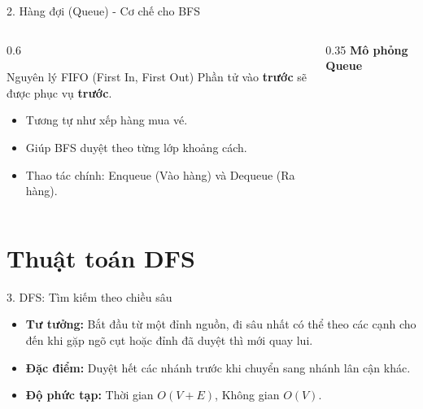 \begin{frame}{2. Hàng đợi (Queue) - Cơ chế cho BFS}
    \begin{columns}
        \begin{column}{0.6\textwidth}
            \begin{block}{Nguyên lý FIFO (First In, First Out)}
                Phần tử vào \textbf{trước} sẽ được phục vụ \textbf{trước}.
            \end{block}
            \begin{itemize}
                \item Tương tự như xếp hàng mua vé.
                \item Giúp BFS duyệt theo từng lớp khoảng cách.
                \item Thao tác chính: Enqueue (Vào hàng) và Dequeue (Ra hàng).
            \end{itemize}
        \end{column}
        \begin{column}{0.35\textwidth}
            \centering \textbf{Mô phỏng Queue}\\
        \end{column}
    \end{columns}
\end{frame}

\section{Thuật toán DFS}
\begin{frame}{3. DFS: Tìm kiếm theo chiều sâu}
    \begin{itemize}
        \item \textbf{Tư tưởng:} Bắt đầu từ một đỉnh nguồn, đi sâu nhất có thể theo các cạnh cho đến khi gặp ngõ cụt hoặc đỉnh đã duyệt thì mới quay lui.
        \item \textbf{Đặc điểm:} Duyệt hết các nhánh trước khi chuyển sang nhánh lân cận khác.
        \item \textbf{Độ phức tạp:} Thời gian $O(V + E)$, Không gian $O(V)$.
    \end{itemize}
\end{frame}

